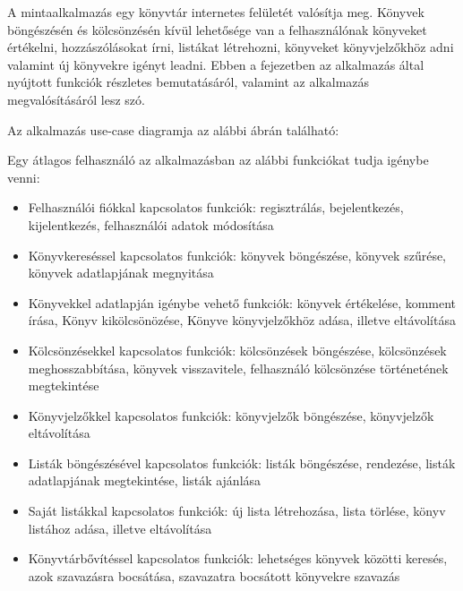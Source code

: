 
A mintaalkalmazás egy könyvtár internetes felületét valósítja meg. Könyvek böngészésén és kölcsönzésén kívül lehetősége van a felhasználónak könyveket értékelni, hozzászólásokat írni, listákat létrehozni, könyveket könyvjelzőkhöz adni valamint új könyvekre igényt leadni. Ebben a fejezetben az alkalmazás által nyújtott funkciók részletes bemutatásáról, valamint az alkalmazás megvalósításáról lesz szó.

Az alkalmazás use-case diagramja az alábbi ábrán található:


\bigskip

\sloppy
\noindent Egy átlagos felhasználó az alkalmazásban az alábbi funkciókat tudja igénybe venni:
\begin{itemize}
    \item Felhasználói fiókkal kapcsolatos funkciók: regisztrálás, bejelentkezés, kijelentkezés, felhasználói adatok módosítása
    \item Könyvkereséssel kapcsolatos funkciók: könyvek böngészése, könyvek szűrése, könyvek adatlapjának megnyitása
    \item Könyvekkel adatlapján igénybe vehető funkciók: könyvek értékelése, komment írása, Könyv kikölcsönözése, Könyve könyvjelzőkhöz adása, illetve eltávolítása
    \item Kölcsönzésekkel kapcsolatos funkciók: kölcsönzések böngészése, kölcsönzések meghosszabbítása, könyvek visszavitele, felhasználó kölcsönzése történetének megtekintése
    \item Könyvjelzőkkel kapcsolatos funkciók: könyvjelzők böngészése, könyvjelzők eltávolítása
    \item Listák böngészésével kapcsolatos funkciók: listák böngészése, rendezése, listák adatlapjának megtekintése, listák ajánlása
    \item Saját listákkal kapcsolatos funkciók: új lista létrehozása, lista törlése, könyv listához adása, illetve eltávolítása
    \item Könyvtárbővítéssel kapcsolatos funkciók: lehetséges könyvek közötti keresés, azok szavazásra bocsátása, szavazatra bocsátott könyvekre szavazás
\end{itemize}
\fussy

